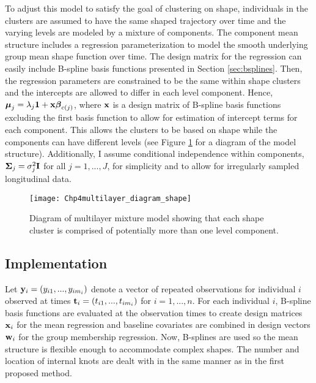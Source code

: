 To adjust this model to satisfy the goal of clustering on shape, individuals in the clusters are assumed to have the same shaped trajectory over time and the varying levels are modeled by a mixture of components. The component mean structure includes a regression parameterization to model the smooth underlying group mean shape function over time. The design matrix for the regression can easily include B-spline basis functions presented in Section \ref{sec:bsplines}. Then, the regression parameters are constrained to be the same within shape clusters and the intercepts are allowed to differ in each level component. Hence, $\boldsymbol\mu_{j}=\lambda_{j}\mathbf 1+\mathbf x \boldsymbol\beta_{c(j)}$, where $\mathbf x$ is a design matrix of B-spline basis functions excluding the first basis function to allow for estimation of intercept terms for each component. This allows the clusters to be based on shape while the components can have different levels (see Figure \ref{fig:diashape} for a diagram of the model structure). Additionally, I assume conditional independence within components, $\boldsymbol\Sigma_{j}=\sigma^{2}_{j}\mathbf I$ for all $j=1,...,J$,  for simplicity and to allow for irregularly sampled longitudinal data.
\begin{figure}[h]
\centering
\texttt{[image: Chp4multilayer\_diagram\_shape]}
\caption{Diagram of multilayer mixture model showing that each shape cluster is comprised of potentially more than one level component.}
\label{fig:diashape}
\end{figure}

\subsection{Implementation}
Let $\mathbf y_{i}=(y_{i1},...,y_{im_{i}})$ denote a vector of repeated observations for individual $i$ observed at times $\mathbf t_{i}=(t_{i1},...,t_{im_{i}})$  for $i=1,...,n$. For each individual $i$, B-spline basis functions are evaluated at the observation times to create design matrices $\mathbf x_{i}$ for the mean regression and baseline covariates are combined in design vectors $\mathbf w_{i}$ for the group membership regression. Now, B-splines are used so the mean structure is flexible enough to accommodate complex shapes. The number and location of internal knots are dealt with in the same manner as in the first proposed method.

